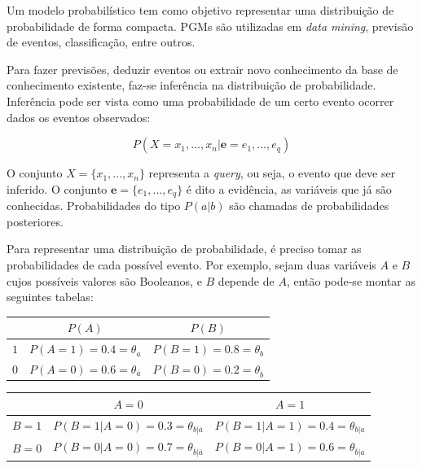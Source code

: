 \documentclass[a4paper,10pt]{article}
\theoremstyle{plain}
\begin{document}
Um modelo probabilístico tem como objetivo representar uma distribuição de probabilidade de forma
compacta. PGMs são utilizadas em \textit{data mining}, previsão de eventos, classificação, entre
outros.

Para fazer previsões, deduzir eventos ou extrair novo conhecimento da base de conhecimento
existente, faz-se inferência na distribuição de probabilidade. Inferência pode ser vista como uma
probabilidade de um certo evento ocorrer dados os eventos observados:

\begin{equation*}
  P(X=x_1,...,x_n|\mathbf{e}=e_1,...,e_q)
\end{equation*}

O conjunto $X=\{x_1,...,x_n\}$ representa a \textit{query}, ou seja, o evento que deve ser
inferido. O conjunto $\mathbf{e}=\{e_1,...,e_q\}$ é dito a evidência, as variáveis que já são
conhecidas. Probabilidades do tipo $P(a|b)$ são chamadas de probabilidades posteriores.

Para representar uma distribuição de probabilidade, é preciso tomar as probabilidades de cada
possível evento. Por exemplo, sejam duas variáveis $A$ e $B$ cujos possíveis valores são Booleanos,
e $B$ depende de $A$, então pode-se montar as seguintes tabelas:

\begin{table}[h]
  \begin{center}
    \begin{tabular}{l | c | c}
      & $P(A)$ & $P(B)$ \\
      \hline
      $1$ & $P(A=1)=0.4=\theta_a$ & $P(B=1)=0.8=\theta_b$ \\
      $0$ & $P(A=0)=0.6=\theta_{\overline{a}}$ & $P(B=0)=0.2=\theta_{\overline{b}}$ \\
    \end{tabular}
    \newline
    \vspace*{0.5cm}
    \newline
    \begin{tabular}{l | c | c}
      & $A=0$ & $A=1$ \\
      \hline
      $B=1$ & $P(B=1|A=0)=0.3=\theta_{b|\overline{a}}$ & $P(B=1|A=1)=0.4=\theta_{b|a}$ \\
      $B=0$ & $P(B=0|A=0)=0.7=\theta_{\overline{b}|\overline{a}}$ & $P(B=0|A=1)=0.6=\theta_{\overline{b}|a}$ \\
    \end{tabular}
  \end{center}
\end{table}
\end{document}
